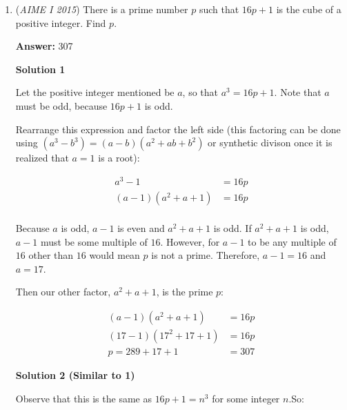 \begin{enumerate}
 The probability of having exactly 2 Canadian sleepers is $\frac{3}{9} \cdot \frac{2}{8} \cdot \frac{6}{7} \cdot 3$.

 The probability of having exactly 2 American sleepers is $\frac{4}{9} \cdot \frac{3}{8} \cdot \frac{5}{7} \cdot 3$.

 Thus, adding these up our total probability is $\frac{55}{84}$. Adding the numerator and denominator gives us our desired $55+84=\boxed{139}.$



	\item (\textit{AIME I 2015}) There is a prime number $p$ such that $16p+1$ is the cube of a positive integer.  Find $p$.


 



 
 \textbf{Answer: }307



\textbf{Solution 1}

Let the positive integer mentioned be $a$, so that $a^3 = 16p+1$. Note that $a$ must be odd, because $16p+1$ is odd.

 Rearrange this expression and factor the left side (this factoring can be done using $(a^3-b^3) = (a-b)(a^2+a b+b^2)$ or synthetic divison once it is realized that $a = 1$ is a root):

 
 \begin{align*} a^3-1 &= 16p\\ (a-1)(a^2+a+1) &= 16p\\ \end{align*}


 Because $a$ is odd, $a-1$ is even and $a^2+a+1$ is odd. If $a^2+a+1$ is odd, $a-1$ must be some multiple of $16$. However, for $a-1$ to be any multiple of $16$ other than $16$ would mean $p$ is not a prime. Therefore, $a-1 = 16$ and $a = 17$.

 Then our other factor, $a^2+a+1$, is the prime $p$:

 
 \begin{align*} (a-1)(a^2+a+1) &= 16p\\ (17-1)(17^2+17+1) &=16p\\ p = 289+17+1 &= \boxed{307} \end{align*}





\textbf{Solution 2 (Similar to 1)}

Observe that this is the same as $16p+1=n^3$ for some integer $n$.So:


\end{enumerate}

